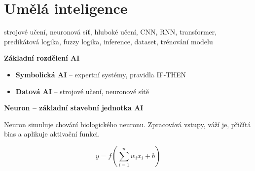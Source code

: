 \documentclass[a4paper,10pt]{article}
\begin{document}
\section{Umělá inteligence}

\begin{pojmybox}
strojové učení, neuronová síť, hluboké učení, CNN, RNN, transformer,
predikátová logika, fuzzy logika, inference, dataset, trénování modelu
\end{pojmybox}

\begin{vysvetlenibox}

\textbf{Základní rozdělení AI}

\begin{itemize}
\item \textbf{Symbolická AI} – expertní systémy, pravidla IF-THEN
\item \textbf{Datová AI} – strojové učení, neuronové sítě
\end{itemize}

\textbf{Neuron – základní stavební jednotka AI}

Neuron simuluje chování biologického neuronu. Zpracovává vstupy,
váží je, přičítá bias a aplikuje aktivační funkci.

\begin{center}
\end{center}

\begin{vzorcebox}
\[
y = f\left(\sum_{i=1}^{n} w_i x_i + b\right)
\]
\end{vzorcebox}


\end{vysvetlenibox}
\end{document}

